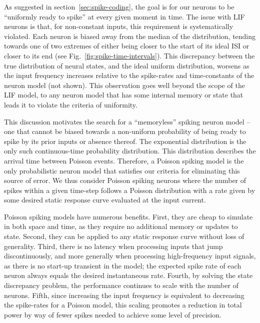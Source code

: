 As suggested in section~\ref{sec:spike-coding}, the goal is for our neurons to be ``uniformly ready to spike'' at every given moment in time.
The issue with LIF neurons is that, for non-constant inputs, this requirement is systematically violated.
Each neuron is biased away from the median of the distribution, tending towards one of two extremes of either being closer to the start of its ideal ISI or closer to its end (see Fig.~\ref{fig:spike-time-intervals}).
This discrepancy between the true distribution of neural states, and the ideal uniform distribution, worsens as the input frequency increases relative to the spike-rates and time-constants of the neuron model (not shown).
This observation goes well beyond the scope of the LIF model, to any neuron model that has some internal memory or state that leads it to violate the criteria of uniformity.

This discussion motivates the search for a ``memoryless'' spiking neuron model -- one that cannot be biased towards a non-uniform probability of being ready to spike by its prior inputs or absence thereof.
The exponential distribution is the only such continuous-time probability distribution.
This distribution describes the arrival time between Poisson events.
Therefore, a Poisson spiking model is the only probabilistic neuron model that satisfies our criteria for eliminating this source of error.
We thus consider Poisson spiking neurons where the number of spikes within a given time-step follows a Poisson distribution with a rate given by some desired static response curve evaluated at the input current.

Poisson spiking models have numerous benefits.
First, they are cheap to simulate in both space and time, as they require no additional memory or updates to state.
Second, they can be applied to any static response curve without loss of generality.
Third, there is no latency when processing inputs that jump discontinuously, and more generally when processing high-frequency input signals, as there is no start-up transient in the model; the expected spike rate of each neuron always equals the desired instantaneous rate.
Fourth, by solving the state discrepancy problem, the performance continues to scale with the number of neurons.
Fifth, since increasing the input frequency is equivalent to decreasing the spike-rates for a Poisson model, this scaling promotes a reduction in total power by way of fewer spikes needed to achieve some level of precision.

